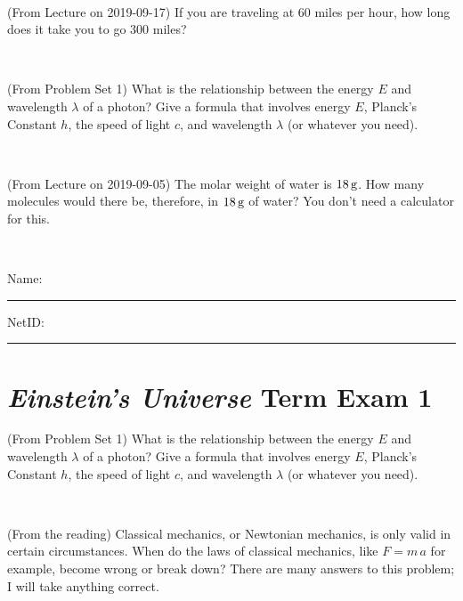 \documentclass[12pt, letterpaper]{article}
\begin{document}
\vfill ~

\begin{problem} (From Lecture on 2019-09-17)
If you are traveling at 60 miles per hour, how long does
it take you to go 300 miles?
\end{problem}


\vfill ~

\begin{problem} (From Problem Set 1)
What is the relationship between the energy $E$ and wavelength
$\lambda$ of a photon? Give a formula that involves energy $E$,
Planck's Constant $h$, the speed of light $c$, and wavelength
$\lambda$ (or whatever you need).
\end{problem}

\vfill ~

\begin{problem} (From Lecture on 2019-09-05)
The molar weight of water is $18\,\mathrm{g}$. How many molecules would there
be, therefore, in $18\,\mathrm{g}$ of water? You don't need a calculator for
this.
\end{problem}


\vfill ~


\cleardoublepage



\noindent
Name: \rule[-1ex]{0.60\textwidth}{0.1pt}
NetID: \rule[-1ex]{0.20\textwidth}{0.1pt}

\section*{\textsl{Einstein's Universe} Term Exam 1}
\setcounter{problem}{1}


\begin{problem} (From Problem Set 1)
What is the relationship between the energy $E$ and wavelength
$\lambda$ of a photon? Give a formula that involves energy $E$,
Planck's Constant $h$, the speed of light $c$, and wavelength
$\lambda$ (or whatever you need).
\end{problem}

\vfill ~

\begin{problem} (From the reading)
Classical mechanics, or Newtonian mechanics, is only valid in certain
circumstances. When do the laws of classical mechanics, like $F =
m\,a$ for example, become wrong or break down? There are many answers
to this problem; I will take anything correct.
\end{problem}


\vfill ~
\end{document}

